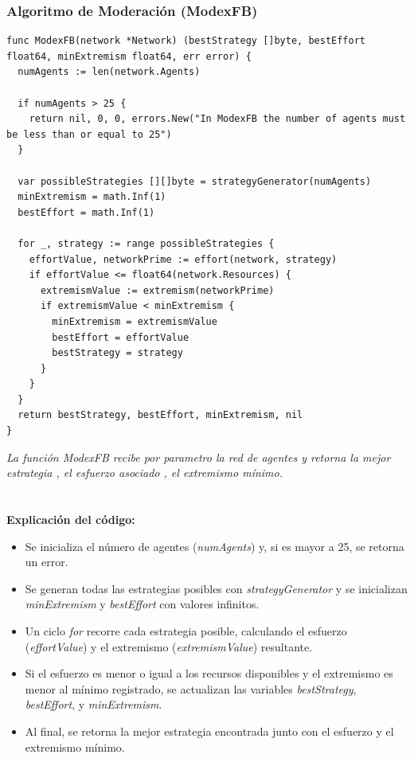 \documentclass[letterpaper,10pt]{article}
\begin{document}
\subsubsection*{Algoritmo de Moderación (ModexFB)}
\begin{lstlisting}[caption={Algoritmo de Fuerza Bruta}, label={lst:modexfb}]
func ModexFB(network *Network) (bestStrategy []byte, bestEffort float64, minExtremism float64, err error) {
  numAgents := len(network.Agents)
  
  if numAgents > 25 {
    return nil, 0, 0, errors.New("In ModexFB the number of agents must be less than or equal to 25")
  }

  var possibleStrategies [][]byte = strategyGenerator(numAgents)
  minExtremism = math.Inf(1)
  bestEffort = math.Inf(1)
  
  for _, strategy := range possibleStrategies {
    effortValue, networkPrime := effort(network, strategy)
    if effortValue <= float64(network.Resources) {
      extremismValue := extremism(networkPrime)
      if extremismValue < minExtremism {
        minExtremism = extremismValue
        bestEffort = effortValue
        bestStrategy = strategy
      }
    }
  }
  return bestStrategy, bestEffort, minExtremism, nil
}
\end{lstlisting}
\textit{La función \textit{ModexFB} recibe por parametro la red de agentes y retorna la mejor estrategia , el esfuerzo asociado , el extremismo mínimo.}
\\
\\
\\
\textbf{Explicación del código:}
\begin{itemize}
  \item Se inicializa el número de agentes (\textit{numAgents}) y, si es mayor a 25, se retorna un error.
  \item Se generan todas las estrategias posibles con \textit{strategyGenerator} y se inicializan \textit{minExtremism} y \textit{bestEffort} con valores infinitos.
  \item Un ciclo \textit{for} recorre cada estrategia posible, calculando el esfuerzo (\textit{effortValue}) y el extremismo (\textit{extremismValue}) resultante.
  \item Si el esfuerzo es menor o igual a los recursos disponibles y el extremismo es menor al mínimo registrado, se actualizan las variables \textit{bestStrategy}, \textit{bestEffort}, y \textit{minExtremism}.
  \item Al final, se retorna la mejor estrategia encontrada junto con el esfuerzo y el extremismo mínimo.
\end{itemize}
\end{document}
